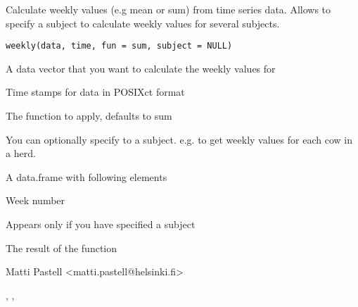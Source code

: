 \documentclass{book}
\begin{document}
\begin{Description}\relax
Calculate weekly values (e.g mean or sum) from time series data. Allows
to specify a subject to calculate weekly values for several subjects.
\end{Description}
\begin{Usage}
\begin{verbatim}
weekly(data, time, fun = sum, subject = NULL)
\end{verbatim}
\end{Usage}
\begin{Arguments}
\begin{ldescription}
\item[\code{data}] A data vector that you want to calculate the weekly values
for
\item[\code{time}] Time stamps for data in POSIXct format
\item[\code{fun}] The function to apply, defaults to sum
\item[\code{subject}] You can optionally specify to a subject. e.g. to get
weekly values for each cow in a herd.
\end{ldescription}
\end{Arguments}
\begin{Value}
A data.frame with following elements
\begin{ldescription}
\item[\code{Week}] Week number
\item[\code{Subject}] Appears only if you have specified a subject
\item[\code{Result}] The result of the function
\end{ldescription}
\end{Value}
\begin{Author}\relax
Matti Pastell <matti.pastell@helsinki.fi>
\end{Author}
\begin{SeeAlso}\relax
{}, ,
\end{SeeAlso}
\begin{Examples}
\end{Examples}
\end{document}
